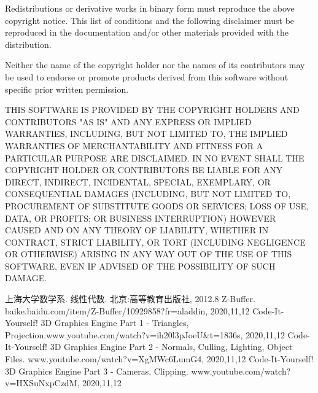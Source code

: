 \documentclass[12pt,oneside,a4paper]{ctexart}
\begin{document}
Redistributions or derivative works in binary form must reproduce the above copyright notice. This list of conditions and the following disclaimer must be reproduced in the documentation and/or other materials provided with the distribution.

Neither the name of the copyright holder nor the names of its contributors may be used to endorse or promote products derived from this software without specific prior written permission.

THIS SOFTWARE IS PROVIDED BY THE COPYRIGHT HOLDERS AND CONTRIBUTORS "AS IS" AND ANY EXPRESS OR IMPLIED WARRANTIES, INCLUDING, BUT NOT LIMITED TO, THE IMPLIED WARRANTIES OF MERCHANTABILITY AND FITNESS FOR A PARTICULAR PURPOSE ARE DISCLAIMED. IN NO EVENT SHALL THE COPYRIGHT HOLDER OR CONTRIBUTORS BE LIABLE FOR ANY DIRECT, INDIRECT, INCIDENTAL, SPECIAL, EXEMPLARY, OR CONSEQUENTIAL DAMAGES (INCLUDING, BUT NOT LIMITED TO, PROCUREMENT OF SUBSTITUTE GOODS OR SERVICES; LOSS OF USE, DATA, OR PROFITS; OR BUSINESS INTERRUPTION) HOWEVER CAUSED AND ON ANY THEORY OF LIABILITY, WHETHER IN CONTRACT, STRICT LIABILITY, OR TORT (INCLUDING NEGLIGENCE OR OTHERWISE) ARISING IN ANY WAY OUT OF THE USE OF THIS SOFTWARE, EVEN IF ADVISED OF THE POSSIBILITY OF SUCH DAMAGE.

\begin{thebibliography}{99}
	上海大学数学系. 线性代数. 北京:高等教育出版社, 2012.8
	Z-Buffer. baike.baidu.com/item/Z-Buffer/10929858?fr=aladdin, 2020,11,12
	Code-It-Yourself! 3D Graphics Engine Part 1 - Triangles, Projection.www.youtube.com/watch?v=ih20l3pJoeU\&t=1836s, 2020,11,12
	Code-It-Yourself! 3D Graphics Engine Part 2 - Normals, Culling, Lighting, Object Files. www.youtube.com/watch?v=XgMWc6LumG4, 2020,11,12
	Code-It-Yourself! 3D Graphics Engine Part 3 - Cameras, Clipping. www.youtube.com/watch?v=HXSuNxpCzdM, 2020,11,12
\end{thebibliography}
\end{document}
